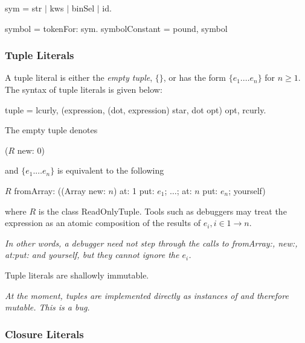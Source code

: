 \documentclass{article}
\newcommand{\code}[1]{{\sf #1}}
\begin{document}
\begin{newspeak}
sym = str $|$ kws $|$ binSel $|$ id. 
 
symbol = tokenFor: sym.
symbolConstant = pound, symbol
\end{newspeak}


\subsubsection{ Tuple Literals}
\label{tuple}

A tuple literal is either the {\em empty tuple},  $\{\}$, or has the form $\{e_1 . \ldots e_n\}$ for $n \ge 1$.  
The syntax of tuple literals is given below:
\begin{newspeak}
tuple =  lcurly, (expression, (dot, expression) star, dot opt) opt,  rcurly.
\end{newspeak}

The empty tuple denotes 
\begin{newspeak}
($R$ new: $0$) 
\end{newspeak}

and $\{e_1 . \ldots e_n\}$  is equivalent to the following
\begin{newspeak}
$R$ fromArray: ((Array new: $n$) at: 1 put: $e_1$;  $\ldots$; at: $n$ put: $e_n$; yourself)
\end{newspeak}

where $R$ is the class \code{ReadOnlyTuple}. Tools  such as debuggers may treat the expression as an atomic composition of the results of $e_i, i \in 1 \to n$. 

{\it
In other words, a debugger need not step through the calls to \code{fromArray:}, \code{new:}, \code{at:put:} and \code{yourself}, but they cannot ignore the $e_i$.
}

Tuple literals are shallowly immutable.

{\it 
At the moment, tuples are implemented directly as instances of  and therefore mutable. This is a bug.
}

\subsubsection{ Closure Literals}
\label{block}
\end{document}
